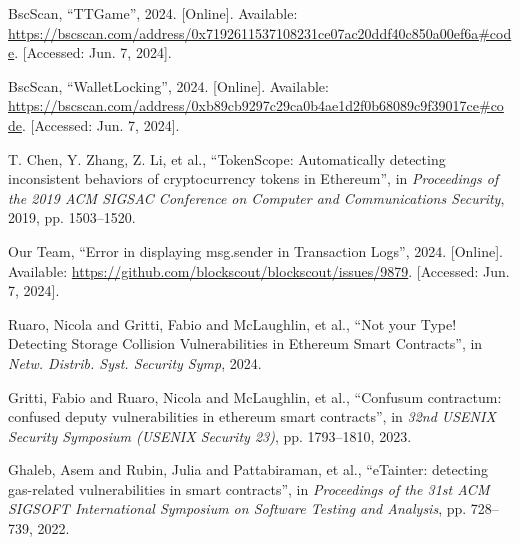 \begin{thebibliography}{00}
 BscScan, ``TTGame'', 2024. [Online]. Available: \url{https://bscscan.com/address/0x7192611537108231ce07ac20ddf40c850a00ef6a#code}. [Accessed: Jun. 7, 2024].

 BscScan, ``WalletLocking'', 2024. [Online]. Available: \url{https://bscscan.com/address/0xb89cb9297c29ca0b4ae1d2f0b68089c9f39017ce#code}. [Accessed: Jun. 7, 2024].

 T. Chen, Y. Zhang, Z. Li, et al., ``TokenScope: Automatically detecting inconsistent behaviors of cryptocurrency tokens in Ethereum'', in \textit{Proceedings of the 2019 ACM SIGSAC Conference on Computer and Communications Security}, 2019, pp. 1503--1520.

 Our Team, ``Error in displaying msg.sender in Transaction Logs'', 2024. [Online]. Available: \url{https://github.com/blockscout/blockscout/issues/9879}. [Accessed: Jun. 7, 2024].

 Ruaro, Nicola and Gritti, Fabio and McLaughlin, et al., ``Not your Type! Detecting Storage Collision Vulnerabilities in Ethereum Smart Contracts'', in \textit{Netw. Distrib. Syst. Security Symp}, 2024.

 Gritti, Fabio and Ruaro, Nicola and McLaughlin, et al., ``Confusum contractum: confused deputy vulnerabilities in ethereum smart contracts'', in \textit{32nd USENIX Security Symposium (USENIX Security 23)}, pp. 1793--1810, 2023.

 Ghaleb, Asem and Rubin, Julia and Pattabiraman, et al., ``eTainter: detecting gas-related vulnerabilities in smart contracts'', in \textit{Proceedings of the 31st ACM SIGSOFT International Symposium on Software Testing and Analysis}, pp. 728--739, 2022.

\end{thebibliography}
